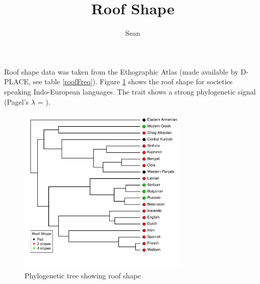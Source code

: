 \documentclass[11pt]{amsart}
\title{Roof Shape}
\author{Sean}
\begin{document}
\maketitle

Roof shape data was taken from the Ethographic Atlas (made available by D-PLACE, see table \ref{roofFreq}). Figure \ref{tree} shows the roof shape for societies speaking Indo-European languages. The trait shows a strong phylogenetic signal (Pagel's $\lambda$ = ).



\begin{figure}[h]
\caption{Phylogenetic tree showing roof shape}\label{tree}
\includegraphics[width=8cm]{../results/IndoEuropean_RoofTypes.pdf}
\end{figure}
\end{document}
